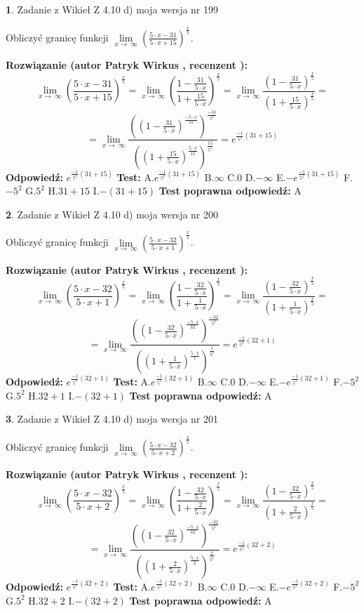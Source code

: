 \documentclass[12pt, a4paper]{article}
\theoremstyle{definition} %
\newtheorem{zad}{}
\newcommand{\zadStart}[1]{\begin{zad}#1\newline}
\newcommand{\zadStop}{\end{zad}}
\newcommand{\rozwStart}[2]{\noindent \textbf{Rozwiązanie (autor #1 , recenzent #2): }\newline}
\newcommand{\rozwStop}{\newline}
\newcommand{\odpStart}{\noindent \textbf{Odpowiedź:}\newline}
\newcommand{\odpStop}{\newline}
\newcommand{\testStart}{\noindent \textbf{Test:}\newline}
\newcommand{\testStop}{\newline}
\newcommand{\kluczStart}{\noindent \textbf{Test poprawna odpowiedź:}\newline}
\newcommand{\kluczStop}{\newline}
\begin{document}
\zadStart{Zadanie z Wikieł Z 4.10 d) moja wersja nr 199}


Obliczyć granicę funkcji  $\lim\limits_{x\to\ \infty}(\frac{5\cdot x-31}{5\cdot x+15})^{\frac{x}{5}}$.
\zadStop
\rozwStart{Patryk Wirkus}{}
$$\lim\limits_{x\to\ \infty}(\frac{5\cdot x-31}{5\cdot x+15})^{\frac{x}{5}} = \lim\limits_{x\to\ \infty}(\frac{1-\frac{31}{5\cdot x}}{1+\frac{15}{5\cdot x}})^{\frac{x}{5}}=\lim\limits_{x\to\ \infty}\frac{(1-\frac{31}{5\cdot x})^{\frac{x}{5}}}{(1+\frac{15}{5\cdot x})^{\frac{x}{5}}}=$$
$$=\lim\limits_{x\to\ \infty}\frac{((1-\frac{31}{5\cdot x})^{\frac{-5\cdot x}{31}})^{\frac{-31}{5^{2}}}}{((1+\frac{15}{5\cdot x})^{\frac{5\cdot x}{15}})^{\frac{15}{5^{2}}}}=e^{\frac{-1}{5^{2}}(31+15)}$$
\rozwStop
\odpStart
$e^{\frac{-1}{5^{2}}(31+15)}$
\odpStop
\testStart
A.$e^{\frac{-1}{5^{2}}(31+15)}$ B.$\infty$ C.$0$ D.$-\infty$ E.$-e^{\frac{-1}{5^{2}}(31+15)}$
F.$-5^{2}$ G.$5^{2}$
H.$31+15$
I.$-(31+15)$
\testStop
\kluczStart
A
\kluczStop



\zadStart{Zadanie z Wikieł Z 4.10 d) moja wersja nr 200}


Obliczyć granicę funkcji  $\lim\limits_{x\to\ \infty}(\frac{5\cdot x-32}{5\cdot x+1})^{\frac{x}{5}}$.
\zadStop
\rozwStart{Patryk Wirkus}{}
$$\lim\limits_{x\to\ \infty}(\frac{5\cdot x-32}{5\cdot x+1})^{\frac{x}{5}} = \lim\limits_{x\to\ \infty}(\frac{1-\frac{32}{5\cdot x}}{1+\frac{1}{5\cdot x}})^{\frac{x}{5}}=\lim\limits_{x\to\ \infty}\frac{(1-\frac{32}{5\cdot x})^{\frac{x}{5}}}{(1+\frac{1}{5\cdot x})^{\frac{x}{5}}}=$$
$$=\lim\limits_{x\to\ \infty}\frac{((1-\frac{32}{5\cdot x})^{\frac{-5\cdot x}{32}})^{\frac{-32}{5^{2}}}}{((1+\frac{1}{5\cdot x})^{\frac{5\cdot x}{1}})^{\frac{1}{5^{2}}}}=e^{\frac{-1}{5^{2}}(32+1)}$$
\rozwStop
\odpStart
$e^{\frac{-1}{5^{2}}(32+1)}$
\odpStop
\testStart
A.$e^{\frac{-1}{5^{2}}(32+1)}$ B.$\infty$ C.$0$ D.$-\infty$ E.$-e^{\frac{-1}{5^{2}}(32+1)}$
F.$-5^{2}$ G.$5^{2}$
H.$32+1$
I.$-(32+1)$
\testStop
\kluczStart
A
\kluczStop



\zadStart{Zadanie z Wikieł Z 4.10 d) moja wersja nr 201}


Obliczyć granicę funkcji  $\lim\limits_{x\to\ \infty}(\frac{5\cdot x-32}{5\cdot x+2})^{\frac{x}{5}}$.
\zadStop
\rozwStart{Patryk Wirkus}{}
$$\lim\limits_{x\to\ \infty}(\frac{5\cdot x-32}{5\cdot x+2})^{\frac{x}{5}} = \lim\limits_{x\to\ \infty}(\frac{1-\frac{32}{5\cdot x}}{1+\frac{2}{5\cdot x}})^{\frac{x}{5}}=\lim\limits_{x\to\ \infty}\frac{(1-\frac{32}{5\cdot x})^{\frac{x}{5}}}{(1+\frac{2}{5\cdot x})^{\frac{x}{5}}}=$$
$$=\lim\limits_{x\to\ \infty}\frac{((1-\frac{32}{5\cdot x})^{\frac{-5\cdot x}{32}})^{\frac{-32}{5^{2}}}}{((1+\frac{2}{5\cdot x})^{\frac{5\cdot x}{2}})^{\frac{2}{5^{2}}}}=e^{\frac{-1}{5^{2}}(32+2)}$$
\rozwStop
\odpStart
$e^{\frac{-1}{5^{2}}(32+2)}$
\odpStop
\testStart
A.$e^{\frac{-1}{5^{2}}(32+2)}$ B.$\infty$ C.$0$ D.$-\infty$ E.$-e^{\frac{-1}{5^{2}}(32+2)}$
F.$-5^{2}$ G.$5^{2}$
H.$32+2$
I.$-(32+2)$
\testStop
\kluczStart
A
\kluczStop
\end{document}
